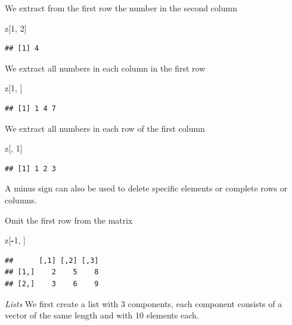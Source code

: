 \documentclass[]{book}
\newenvironment{Shaded}{\begin{snugshade}}{\end{snugshade}}
\newcommand{\DecValTok}[1]{\textcolor[rgb]{0.00,0.00,0.81}{#1}}
\newcommand{\OperatorTok}[1]{\textcolor[rgb]{0.81,0.36,0.00}{\textbf{#1}}}
\newcommand{\NormalTok}[1]{#1}
\theoremstyle{definition}
\theoremstyle{definition}
\theoremstyle{definition}
\theoremstyle{remark}
\begin{document}
We extract from the first row the number in the second column

\begin{Shaded}
\begin{Highlighting}[]
\NormalTok{z[}\DecValTok{1}\NormalTok{, }\DecValTok{2}\NormalTok{]}
\end{Highlighting}
\end{Shaded}

\begin{verbatim}
## [1] 4
\end{verbatim}

We extract all numbers in each column in the first row

\begin{Shaded}
\begin{Highlighting}[]
\NormalTok{z[}\DecValTok{1}\NormalTok{, ]}
\end{Highlighting}
\end{Shaded}

\begin{verbatim}
## [1] 1 4 7
\end{verbatim}

We extract all numbers in each row of the first column

\begin{Shaded}
\begin{Highlighting}[]
\NormalTok{z[, }\DecValTok{1}\NormalTok{]}
\end{Highlighting}
\end{Shaded}

\begin{verbatim}
## [1] 1 2 3
\end{verbatim}

A minus sign can also be used to delete specific elements or complete
rows or columns.

Omit the first row from the matrix

\begin{Shaded}
\begin{Highlighting}[]
\NormalTok{z[}\OperatorTok{-}\DecValTok{1}\NormalTok{, ]}
\end{Highlighting}
\end{Shaded}

\begin{verbatim}
##      [,1] [,2] [,3]
## [1,]    2    5    8
## [2,]    3    6    9
\end{verbatim}

\emph{Lists} We first create a list with 3 components, each component
consists of a vector of the same length and with 10 elements each.
\end{document}
